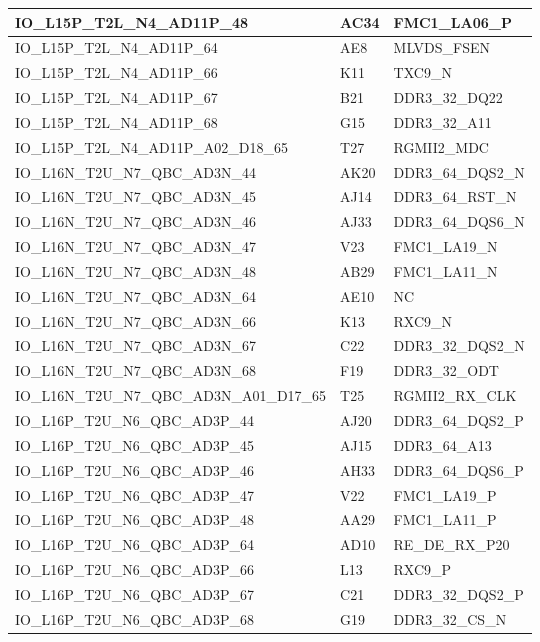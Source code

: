 \begin{footnotesize}
\begin{longtable}{|p{7cm}|p{1cm}|p{5cm}|}
IO\_L15P\_T2L\_N4\_AD11P\_48	&	AC34	&	FMC1\_LA06\_P	\\ \hline
IO\_L15P\_T2L\_N4\_AD11P\_64	&	AE8	&	MLVDS\_FSEN	\\ \hline
IO\_L15P\_T2L\_N4\_AD11P\_66	&	K11	&	TXC9\_N	\\ \hline
IO\_L15P\_T2L\_N4\_AD11P\_67	&	B21	&	DDR3\_32\_DQ22	\\ \hline
IO\_L15P\_T2L\_N4\_AD11P\_68	&	G15	&	DDR3\_32\_A11	\\ \hline
IO\_L15P\_T2L\_N4\_AD11P\_A02\_D18\_65	&	T27	&	RGMII2\_MDC	\\ \hline
IO\_L16N\_T2U\_N7\_QBC\_AD3N\_44	&	AK20	&	DDR3\_64\_DQS2\_N	\\ \hline
IO\_L16N\_T2U\_N7\_QBC\_AD3N\_45	&	AJ14	&	DDR3\_64\_RST\_N	\\ \hline
IO\_L16N\_T2U\_N7\_QBC\_AD3N\_46	&	AJ33	&	DDR3\_64\_DQS6\_N	\\ \hline
IO\_L16N\_T2U\_N7\_QBC\_AD3N\_47	&	V23	&	FMC1\_LA19\_N	\\ \hline
IO\_L16N\_T2U\_N7\_QBC\_AD3N\_48	&	AB29	&	FMC1\_LA11\_N	\\ \hline
IO\_L16N\_T2U\_N7\_QBC\_AD3N\_64	&	AE10	&	NC	\\ \hline
IO\_L16N\_T2U\_N7\_QBC\_AD3N\_66	&	K13	&	RXC9\_N	\\ \hline
IO\_L16N\_T2U\_N7\_QBC\_AD3N\_67	&	C22	&	DDR3\_32\_DQS2\_N	\\ \hline
IO\_L16N\_T2U\_N7\_QBC\_AD3N\_68	&	F19	&	DDR3\_32\_ODT	\\ \hline
IO\_L16N\_T2U\_N7\_QBC\_AD3N\_A01\_D17\_65	&	T25	&	RGMII2\_RX\_CLK	\\ \hline
IO\_L16P\_T2U\_N6\_QBC\_AD3P\_44	&	AJ20	&	DDR3\_64\_DQS2\_P	\\ \hline
IO\_L16P\_T2U\_N6\_QBC\_AD3P\_45	&	AJ15	&	DDR3\_64\_A13	\\ \hline
IO\_L16P\_T2U\_N6\_QBC\_AD3P\_46	&	AH33	&	DDR3\_64\_DQS6\_P	\\ \hline
IO\_L16P\_T2U\_N6\_QBC\_AD3P\_47	&	V22	&	FMC1\_LA19\_P	\\ \hline
IO\_L16P\_T2U\_N6\_QBC\_AD3P\_48	&	AA29	&	FMC1\_LA11\_P	\\ \hline
IO\_L16P\_T2U\_N6\_QBC\_AD3P\_64	&	AD10	&	RE\_DE\_RX\_P20	\\ \hline
IO\_L16P\_T2U\_N6\_QBC\_AD3P\_66	&	L13	&	RXC9\_P	\\ \hline
IO\_L16P\_T2U\_N6\_QBC\_AD3P\_67	&	C21	&	DDR3\_32\_DQS2\_P	\\ \hline
IO\_L16P\_T2U\_N6\_QBC\_AD3P\_68	&	G19	&	DDR3\_32\_CS\_N	\\ \hline

\end{longtable}
\end{footnotesize}
